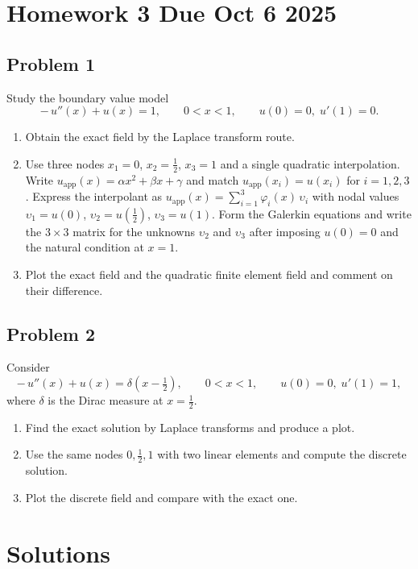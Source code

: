 \documentclass[12pt,a4paper]{article}
\begin{document}
\newpage
\section*{Homework 3 Due Oct 6 2025}
\setcounter{section}{0}

\subsection*{Problem 1}
Study the boundary value model
\[
-\,u''(x)+u(x)=1,\qquad 0<x<1,\qquad u(0)=0,\; u'(1)=0.
\]
\begin{enumerate}[label=(\alph*)]
  \item Obtain the exact field by the Laplace transform route.
  \item Use three nodes $x_1=0$, $x_2=\tfrac12$, $x_3=1$ and a single quadratic interpolation. Write
  \(
  u_{\mathrm{app}}(x)=\alpha x^{2}+\beta x+\gamma
  \)
  and match $u_{\mathrm{app}}(x_i)=u(x_i)$ for $i=1,2,3$. Express the interpolant as
  \(
  u_{\mathrm{app}}(x)=\sum_{i=1}^{3}\varphi_i(x)\, \upsilon_i
  \)
  with nodal values $\upsilon_1=u(0)$, $\upsilon_2=u(\tfrac12)$, $\upsilon_3=u(1)$. Form the Galerkin equations and write the $3\times3$ matrix for the unknowns $\upsilon_2$ and $\upsilon_3$ after imposing $u(0)=0$ and the natural condition at $x=1$.
  \item Plot the exact field and the quadratic finite element field and comment on their difference.
\end{enumerate}

\subsection*{Problem 2}
Consider
\[
-\,u''(x)+u(x)=\delta\!\left(x-\tfrac12\right),\qquad 0<x<1,\qquad u(0)=0,\; u'(1)=1,
\]
where $\delta$ is the Dirac measure at $x=\tfrac12$.
\begin{enumerate}[label=(\alph*)]
  \item Find the exact solution by Laplace transforms and produce a plot.
  \item Use the same nodes $0,\tfrac12,1$ with two linear elements and compute the discrete solution.
  \item Plot the discrete field and compare with the exact one.
\end{enumerate}

\newpage
\section*{Solutions}
\end{document}
